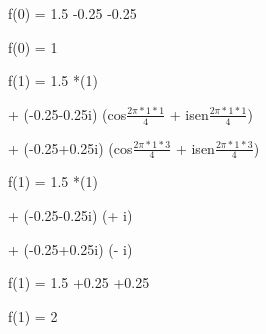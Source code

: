 \begin{question}
\begin{enumerate}[label=\textbf{\alph*})]
      f(0) = 1.5 -0.25 -0.25
      
      f(0) = 1

      f(1) = 1.5 *(1) 
      
             + (-0.25-0.25i) (cos$\frac{2\pi*1*1}{4}$ + isen$\frac{2\pi*1*1}{4}$) 

             + (-0.25+0.25i) (cos$\frac{2\pi*1*3}{4}$ + isen$\frac{2\pi*1*3}{4}$)  

      f(1) = 1.5 *(1) 
      
             + (-0.25-0.25i) (+ i) 

             + (-0.25+0.25i) (- i)  

      f(1) = 1.5 +0.25 +0.25
      
      f(1) = 2
    \end{enumerate}
\end{question}
  